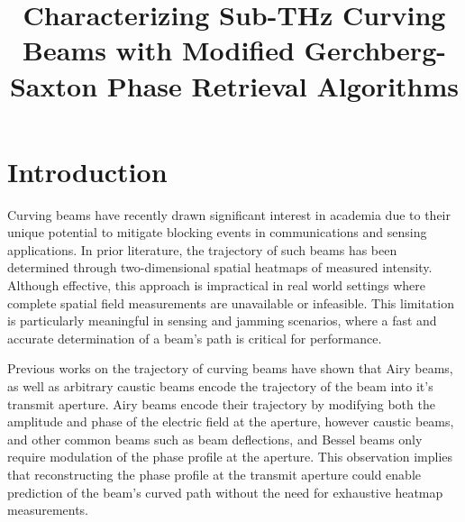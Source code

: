 \documentclass[11pt]{IEEEtran}
\begin{document}
%
\title{Characterizing Sub-THz Curving Beams with Modified Gerchberg-Saxton Phase Retrieval Algorithms }


\author{
}

\maketitle


\IEEEpeerreviewmaketitle

\section{Introduction}

Curving beams have recently drawn significant interest in academia due to their unique potential to mitigate blocking events in communications and sensing applications.
In prior literature, the trajectory of such beams has been determined through two-dimensional spatial heatmaps of measured intensity\cite{AiryObservation, spindel_ms}.
Although effective, this approach is impractical in real world settings where complete spatial field measurements are unavailable or infeasible.
This limitation is particularly meaningful in sensing and jamming scenarios, where a fast and accurate determination of a beam's path is critical for performance.

Previous works on the trajectory of curving beams have shown that Airy beams, as well as arbitrary caustic beams encode the trajectory of the beam into it's transmit aperture\cite{AiryObservation, Froehly}.
Airy beams encode their trajectory by modifying both the amplitude and phase of the electric field at the aperture\cite{AiryObservation}, however caustic beams, and other common beams such as beam deflections, and Bessel beams only require modulation of the phase profile at the aperture\cite{Froehly, beam_tutorial}.
This observation implies that reconstructing the phase profile at the transmit aperture could enable prediction of the beam's curved path without the need for exhaustive heatmap measurements.
\end{document}
